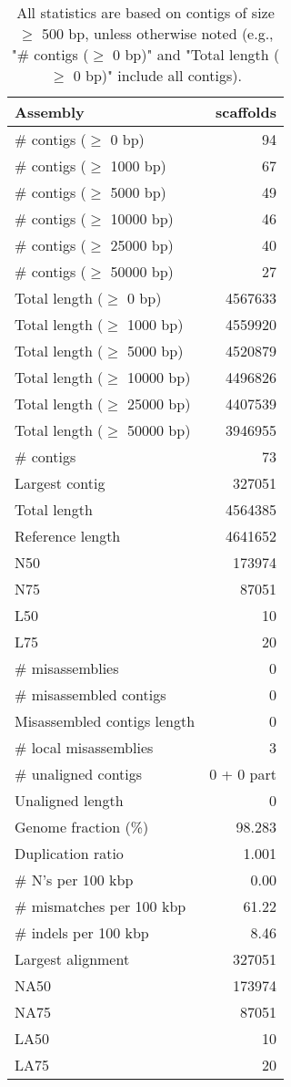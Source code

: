 \documentclass[12pt,a4paper]{article}
\begin{document}
\begin{table}[ht]
\begin{center}
\caption{All statistics are based on contigs of size $\geq$ 500 bp, unless otherwise noted (e.g., "\# contigs ($\geq$ 0 bp)" and "Total length ($\geq$ 0 bp)" include all contigs).}
\begin{tabular}{|l*{1}{|r}|}
\hline
Assembly & scaffolds \\ \hline
\# contigs ($\geq$ 0 bp) & 94 \\ \hline
\# contigs ($\geq$ 1000 bp) & 67 \\ \hline
\# contigs ($\geq$ 5000 bp) & 49 \\ \hline
\# contigs ($\geq$ 10000 bp) & 46 \\ \hline
\# contigs ($\geq$ 25000 bp) & 40 \\ \hline
\# contigs ($\geq$ 50000 bp) & 27 \\ \hline
Total length ($\geq$ 0 bp) & 4567633 \\ \hline
Total length ($\geq$ 1000 bp) & 4559920 \\ \hline
Total length ($\geq$ 5000 bp) & 4520879 \\ \hline
Total length ($\geq$ 10000 bp) & 4496826 \\ \hline
Total length ($\geq$ 25000 bp) & 4407539 \\ \hline
Total length ($\geq$ 50000 bp) & 3946955 \\ \hline
\# contigs & 73 \\ \hline
Largest contig & 327051 \\ \hline
Total length & 4564385 \\ \hline
Reference length & 4641652 \\ \hline
N50 & 173974 \\ \hline
N75 & 87051 \\ \hline
L50 & 10 \\ \hline
L75 & 20 \\ \hline
\# misassemblies & 0 \\ \hline
\# misassembled contigs & 0 \\ \hline
Misassembled contigs length & 0 \\ \hline
\# local misassemblies & 3 \\ \hline
\# unaligned contigs & 0 + 0 part \\ \hline
Unaligned length & 0 \\ \hline
Genome fraction (\%) & 98.283 \\ \hline
Duplication ratio & 1.001 \\ \hline
\# N's per 100 kbp & 0.00 \\ \hline
\# mismatches per 100 kbp & 61.22 \\ \hline
\# indels per 100 kbp & 8.46 \\ \hline
Largest alignment & 327051 \\ \hline
NA50 & 173974 \\ \hline
NA75 & 87051 \\ \hline
LA50 & 10 \\ \hline
LA75 & 20 \\ \hline
\end{tabular}
\end{center}
\end{table}
\end{document}
